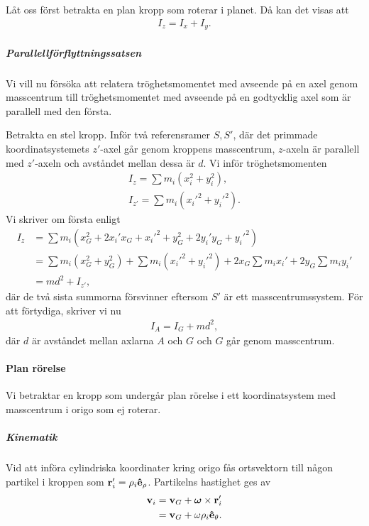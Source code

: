 Låt oss först betrakta en plan kropp som roterar i planet. Då kan det visas att
\begin{align*}
	I_{z} = I_{x} + I_{y}.
\end{align*}

\subparagraph{Parallellförflyttningssatsen}
Vi vill nu försöka att relatera tröghetsmomentet med avseende på en axel genom masscentrum till tröghetsmomentet med avseende på en godtycklig axel som är parallell med den första.

Betrakta en stel kropp. Inför två referensramer $S, S'$, där det primmade koordinatsystemets $z'$-axel går genom kroppens masscentrum, $z$-axeln är parallell med $z'$-axeln och avståndet mellan dessa är $d$. Vi inför tröghetsmomenten
\begin{align*}
	I_{z} = \sum m_{i}(x_{i}^2 + y_{i}^2), \\
	I_{z'} = \sum m_{i}(x_{i}'^2 + y_{i}'^2).
\end{align*}
Vi skriver om första enligt
\begin{align*}
	I_{z} &= \sum m_{i}(x_{G}^2 + 2x_{i}'x_{G} + x_{i}'^{2} + y_{G}^2 + 2y_{i}'y_{G} + y_{i}'^{2}) \\
	      &= \sum m_{i}(x_{G}^2 + y_{G}^2) + \sum m_{i}(x_{i}'^{2} + y_{i}'^{2}) + 2x_{G}\sum m_{i}x_{i}' + 2y_{G}\sum m_{i}y_{i}' \\
	      &= md^2 + I_{z'},
\end{align*}
där de två sista summorna försvinner eftersom $S'$ är ett masscentrumssystem. För att förtydiga, skriver vi nu
\begin{align*}
	I_{A} = I_{G} + md^2,
\end{align*}
där $d$ är avståndet mellan axlarna $A$ och $G$ och $G$ går genom masscentrum.

\paragraph{Plan rörelse}
Vi betraktar en kropp som undergår plan rörelse i ett koordinatsystem med masscentrum i origo som ej roterar.

\subparagraph{Kinematik}
Vid att införa cylindriska koordinater kring origo fås ortsvektorn till någon partikel i kroppen som $\vb{r}_{i}' = \rho_{i}\vu{e}_{\rho}$. Partikelns hastighet ges av
\begin{align*}
	\vb{v}_{i} &= \vb{v}_{G} + \vb*{\omega}\times\vb{r}_{i}' \\
	           &= \vb{v}_{G} + \omega\rho_{i}\vu{e}_{\theta}.
\end{align*}

